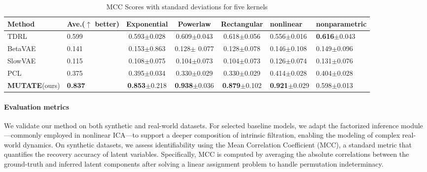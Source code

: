 \documentclass[10pt]{article}
\numberwithin{figure}{section}
\begin{document}
\begin{table}[h]
    \raggedleft
    \hspace{-5pt}
    \setlength{\tabcolsep}{3pt}
    \caption{MCC Scores with standard deviations for five kernels}
    \label{tab:performance}
    \begin{tabular}{llcccll}
        \toprule
        \textbf{Method}&  Ave.($\mathbf{\uparrow}$ better)&Exponential & Powerlaw & Rectangular   &nonlinear&nonparametric\\
        \midrule
        TDRL&  0.599&0.593$\pm$0.028&  0.609$\pm$0.043& 0.618$\pm$0.056&0.556$\pm$0.016&\cellcolor{gray!20}\textbf{0.616}$\pm$0.043\\
        BetaVAE&  0.141&0.153$\pm$0.863& 0.128$\pm$ 0.077& 0.128$\pm$0.078&0.146$\pm$0.108&0.149$\pm$0.096\\
        SlowVAE&  0.115&0.108$\pm$0.075& 0.104$\pm$0.073& 0.104$\pm$0.073& 0.126$\pm$0.074&0.131$\pm$0.076\\
        PCL&  0.375&0.395$\pm$0.034& 0.330$\pm$0.029& 0.330$\pm$0.029&0.414$\pm$0.028&0.404$\pm$0.028\\
        \textbf{MUTATE}(ours) &  \cellcolor{gray!20}\textbf{0.837}&\cellcolor{gray!20}\textbf{0.853}$\pm$0.218& \cellcolor{gray!20}\textbf{0.938}$\pm$0.036& \cellcolor{gray!20}\textbf{0.879}$\pm$0.102&\cellcolor{gray!20}\textbf{0.921}$\pm$0.029&0.598$\pm$0.013\\
        \bottomrule
    \end{tabular}
\end{table}



\paragraph{Evaluation metrics} We validate our method on both synthetic and real-world datasets. For selected baseline models, we adapt the factorized inference module—commonly employed in nonlinear ICA—to support a deeper composition of intrinsic filtration, enabling the modeling of complex real-world dynamics. On synthetic datasets, we assess identifiability using the Mean Correlation Coefficient (MCC), a standard metric that quantifies the recovery accuracy of latent variables. Specifically, MCC is computed by averaging the absolute correlations between the ground-truth and inferred latent components after solving a linear assignment problem to handle permutation indeterminacy.
\end{document}
